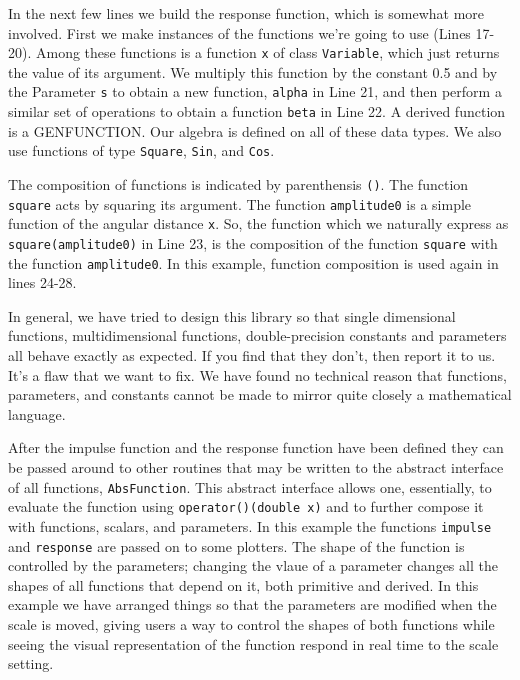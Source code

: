 \documentclass{report}
\begin{document}
\noindent In the next few lines we build the response function, which is
somewhat more involved.  First we make instances of the functions
we're going to use (Lines 17-20).  Among these functions is a function
\verb#x# of class \verb#Variable#, which just returns the value of its
argument.  We multiply this function by the constant 0.5 and by the
Parameter \verb#s# to obtain a new function, \verb#alpha# in Line 21, and then
perform a similar set of operations to obtain a function
\verb#beta# in Line 22.  A derived function is a GENFUNCTION.   Our algebra is 
defined on all of these data types. We also use functions of type
\verb#Square#, \verb#Sin#, and \verb#Cos#.

\noindent The composition of functions is indicated by parenthensis \verb#()#.  The function \verb#square#
acts by squaring its argument.  The function \verb#amplitude0# is a simple function of the
angular distance \verb#x#. So, the function which we naturally express as \verb#square(amplitude0)#
in Line 23, is the composition of the function \verb#square# with the function \verb#amplitude0#.  In 
this example, function composition is used again in lines 24-28.

\noindent In general, we have tried to design this library so that single dimensional functions, 
multidimensional functions, double-precision constants and parameters all behave exactly
as expected.  If you find that they don't, then report it to us.  It's a flaw that we want
to fix.  We have found no technical reason that functions, parameters, and constants cannot
be made to mirror quite closely a mathematical language.

\noindent After the impulse function and the response function have been defined they
can be passed around to other routines that may be written to the abstract interface
of all functions, \verb#AbsFunction#.  This abstract interface allows one, essentially,
to evaluate the function using \verb#operator()(double x)# and to further compose it 
with functions, scalars, and parameters. In this example the functions \verb#impulse#
and \verb#response# are passed on to some plotters. The shape of the function is controlled
by the parameters; changing the vlaue of a parameter changes all the shapes of all functions
that depend on it, both primitive and derived.  In this example we have arranged things
so that the parameters are modified when the scale is moved, giving users a way to 
control the shapes of both functions while seeing the visual representation of the 
function respond in real time to the scale setting. 
\end{document}
